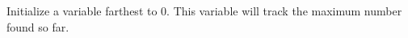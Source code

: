 \documentclass[preview]{standalone}
\begin{document}
Initialize a variable farthest to 0. This variable will track the maximum number found so far.\\
\end{document}
